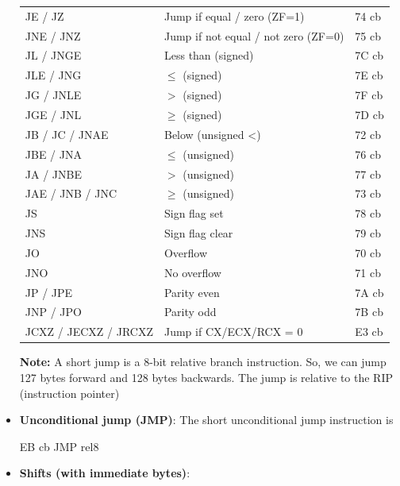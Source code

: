 \documentclass{report}
\begin{document}
\begin{itemize}
\begin{center}
\begin{tabularx}{\textwidth}{@{}XXX@{}}
                    \midrule
                    JE / JZ	&Jump if equal / zero (ZF=1)	&74 cb \\[2ex]
                    JNE / JNZ	&Jump if not equal / not zero (ZF=0)	&75 cb \\[2ex]
                    JL / JNGE	&Less than (signed)	&7C cb\\[2ex]
                    JLE / JNG	&$ \leq$ (signed)	&7E cb\\[2ex]
                    JG / JNLE	&$> $ (signed)	&7F cb\\[2ex]
                    JGE / JNL	&$ \geq $ (signed)	&7D cb\\[2ex]
                    JB / JC / JNAE	&Below (unsigned <)	&72 cb\\[2ex]
                    JBE / JNA	&$ \leq $ (unsigned)	&76 cb\\[2ex]
                    JA / JNBE	&$> $ (unsigned)	&77 cb\\[2ex]
                    JAE / JNB / JNC	&$ \geq $ (unsigned)	&73 cb\\[2ex]
                    JS	&Sign flag set	&78 cb\\[2ex]
                    JNS	&Sign flag clear	&79 cb\\[2ex]
                    JO	&Overflow	&70 cb\\[2ex]
                    JNO	&No overflow	&71 cb\\[2ex]
                    JP / JPE	&Parity even	&7A cb\\[2ex]
                    JNP / JPO	&Parity odd	&7B cb\\[2ex]
                    JCXZ / JECXZ / JRCXZ &Jump if CX/ECX/RCX = 0 &E3 cb \\
                    \bottomrule
                \end{tabularx}
            \end{center}
            \textbf{Note:} A short jump is a 8-bit relative branch instruction. So, we can jump 127 bytes forward and 128 bytes backwards. The jump is relative to the RIP (instruction pointer)
        \item \textbf{Unconditional jump (JMP)}: The short unconditional jump instruction is
            \bigbreak \noindent 
            \begin{cppcode}
            EB cb   JMP rel8
            \end{cppcode}
        \item \textbf{Shifts (with immediate bytes)}: 
            \begin{itemize}

\end{itemize}
\end{itemize}
\end{document}
